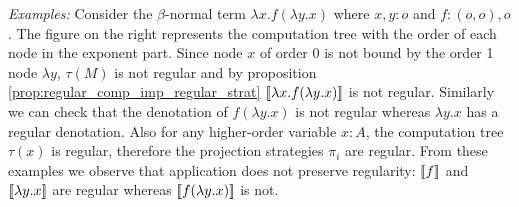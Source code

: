 \noindent \emph{Examples:}
Consider the $\beta$-normal term $\lambda x . f (\lambda y .x)$ where $x,y:o$ and $f:(o,o),o$. The figure on the right represents
the computation tree with the order of each node in the exponent part.
Since node $x$ of order $0$ is not bound by the order 1 node $\lambda y$, $\tau(M)$ is not regular and by proposition
\ref{prop:regular_comp_imp_regular_strat} ${[\![ \lambda x . f (\lambda y .x) ]\!]}$ is not regular.
Similarly we can check that the denotation of $f (\lambda y .x)$ is not regular whereas $\lambda y. x$ has a regular denotation.
Also for any higher-order variable $x:A$, the computation tree $\tau(x)$ is regular, therefore
the projection strategies $\pi_i$ are regular.
From these examples we observe that application does not preserve regularity: ${[\![ f ]\!]}$ and ${[\![ \lambda y. x ]\!]}$ are regular whereas
${[\![ f (\lambda y .x) ]\!]}$ is not.



